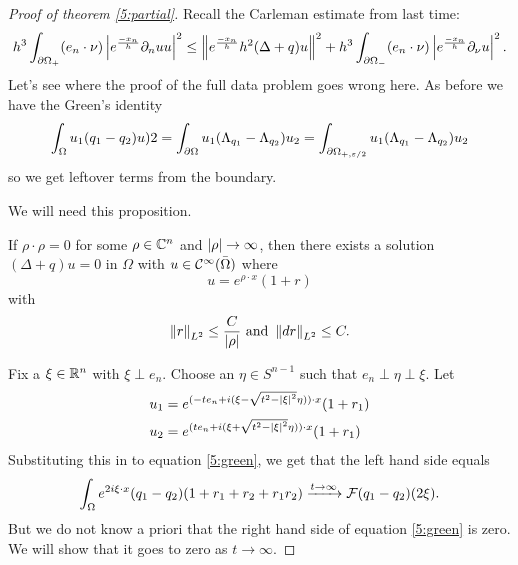 \begin{proof}[Proof of theorem \ref{5:partial}]
  Recall the Carleman estimate from last time:
  \[ h^3 \int_{\partial\Omega_+} (e_n \cdot \nu) \left\lvert e^\frac{-x_n}h \partial_nu u \right\rvert^2 \leq \left\lVert e^\frac{-x_n}h h^2 (\Delta+q) u \right\rVert^2 + h^3 \int_{\partial\Omega_-} (e_n \cdot \nu) \left\lvert e^\frac{-x_n}h \partial_\nu u \right\rvert^2. \]
  Let's see where the proof of the full data problem goes wrong here.
  As before we have the Green's identity
  \begin{equation}\label{5:green}
  \int_\Omega u_1(q_1-q_2)u)2 = \int_{\partial\Omega} u_1(\Lambda_{q_1}-\Lambda_{q_2})u_2 = \int_{\partial\Omega_{+,\varepsilon/2}} u_1(\Lambda_{q_1}-\Lambda_{q_2}) u_2
\end{equation}
  so we get leftover terms from the boundary.

  We will need this proposition.
  \begin{prop}\label{5:cgo}
    If $\rho\cdot\rho=0$ for some $\rho\in\mathbb{C}^n$ and $\left\lvert \rho \right\rvert \to \infty$, then there exists a solution $(\Delta+q)u=0$ in $\Omega$ with $u \in \mathcal{C}^\infty(\bar\Omega)$ where
    \[ u=e^{\rho\cdot x}(1+r) \]
    with
    \[ \left\lVert r \right\rVert_{L^2} \leq \frac C{\left\lvert \rho \right\rvert} \text{ and } \left\lVert dr \right\rVert_{L^2} \leq C. \]
  \end{prop}

  Fix a $\xi \in \mathbb{R}^n$ with $\xi \perp e_n$.
  Choose an $\eta \in S^{n-1}$ such that $e_n \perp \eta \perp \xi$.
  Let
  \begin{align*}
    u_1 &= e^{(-te_n + i(\xi-\sqrt{t^2-\left\lvert \xi \right\rvert^2}\eta))\cdot x}(1+r_1) \\
    u_2 &= e^{(te_n + i(\xi+\sqrt{t^2-\left\lvert \xi \right\rvert^2}\eta))\cdot x}(1+r_1)
  \end{align*}
  Substituting this in to equation \ref{5:green}, we get that the left hand side equals
  \[ \int_\Omega e^{2i \xi\cdot x} (q_1-q_2) (1+r_1+r_2+r_1r_2) \xrightarrow{t\to\infty} \mathcal{F}(q_1-q_2)(2\xi). \]
  But we do not know a priori that the right hand side of equation \ref{5:green} is zero.
  We will show that it goes to zero as $t\to\infty$.


\end{proof}
